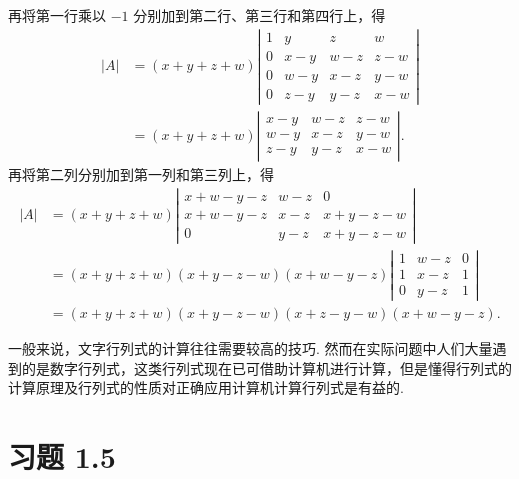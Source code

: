 \documentclass[UTF8, 12pt, fontset=fandol, oneside]{ctexart}
\begin{document}
再将第一行乘以 $-1$ 分别加到第二行、第三行和第四行上，得
\[
\begin{aligned}
|A|
&=(x+y+z+w)
\left|\begin{array}{rrrr}
1 & y & z & w\\
0 & x-y & w-z & z-w\\
0 & w-y & x-z & y-w\\
0 & z-y & y-z & x-w
\end{array}\right|\\
&=(x+y+z+w)
\left|\begin{array}{rrr}
x-y & w-z & z-w\\
w-y & x-z & y-w\\
z-y & y-z & x-w
\end{array}\right|.
\end{aligned}
\]
再将第二列分别加到第一列和第三列上，得
\[
\begin{aligned}
|A|
&=(x+y+z+w)
\left|\begin{array}{rrr}
x+w-y-z & w-z & 0\\
x+w-y-z & x-z & x+y-z-w\\
0 & y-z & x+y-z-w
\end{array}\right|\\
&=(x+y+z+w)(x+y-z-w)(x+w-y-z)
\left|\begin{array}{rrr}
1 & w-z & 0\\
1 & x-z & 1\\
0 & y-z & 1
\end{array}\right|\\
&=(x+y+z+w)(x+y-z-w)(x+z-y-w)(x+w-y-z).
\end{aligned}
\]

一般来说，文字行列式的计算往往需要较高的技巧. 然而在实际问题中人们大量遇到的是数字行列式，这类行列式现在已可借助计算机进行计算，但是懂得行列式的计算原理及行列式的性质对正确应用计算机计算行列式是有益的.

\section*{习题 1.5}
\end{document}
